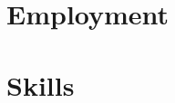 \documentclass[11pt]{moderncv}
\begin{document}
\maketitle


\section{Employment}



\section{Skills}



% 
\end{document}
